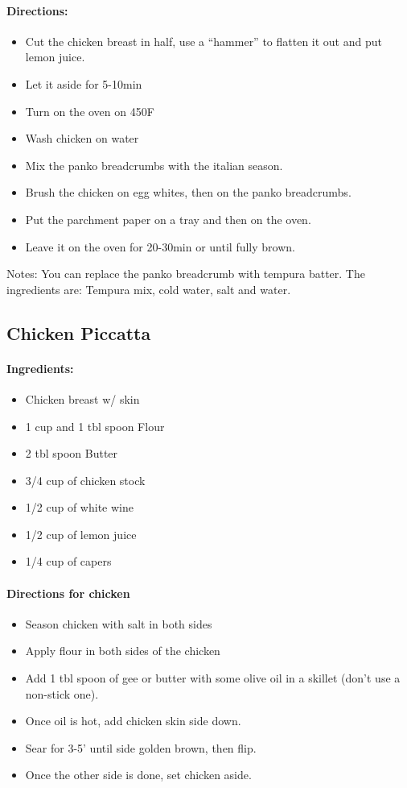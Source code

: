 \documentclass{article}
\begin{document}
\paragraph{Directions:}
\begin{itemize}
	\item Cut the chicken breast in half, use a “hammer” to flatten it out and put lemon juice.
	\item Let it aside for 5-10min
	\item Turn on the oven on 450F
	\item Wash chicken on water
	\item Mix the panko breadcrumbs with the italian season.
	\item Brush the chicken on egg whites, then on the panko breadcrumbs.
	\item Put the parchment paper on a tray and then on the oven.
	\item Leave it on the oven for 20-30min or until fully brown.
\end{itemize}

Notes: You can replace the panko breadcrumb with tempura batter. The ingredients are: Tempura mix, cold water, salt and water.


\subsection{Chicken Piccatta}

\paragraph{Ingredients:}
\begin{itemize}
	\item Chicken breast w/ skin
	\item 1 cup and 1 tbl spoon Flour
	\item 2 tbl spoon Butter
	\item 3/4 cup of chicken stock
	\item 1/2 cup of white wine
	\item 1/2 cup of lemon juice
	\item 1/4 cup of capers
\end{itemize}

\paragraph{Directions for chicken}
\begin{itemize}
	\item Season chicken with salt in both sides
	\item Apply flour in both sides of the chicken
	\item Add 1 tbl spoon of gee or butter with some olive oil in a skillet (don't use a non-stick one).
	\item Once oil is hot, add chicken skin side down.
	\item Sear for 3-5' until side golden brown, then flip.
	\item Once the other side is done, set chicken aside.
\end{itemize}
\end{document}
